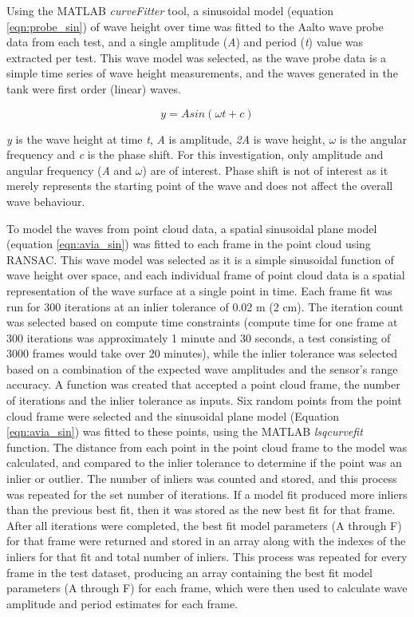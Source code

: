 Using the MATLAB \emph{curveFitter} tool, a sinusoidal model (equation \ref{eqn:probe_sin}) of wave height over time was fitted to the Aalto wave probe data from each test, and a single amplitude (\textit{A}) and period (\textit{t}) value was extracted per test. This wave model was selected, as the wave probe data is a simple time series of wave height measurements, and the waves generated in the tank were first order (linear) waves.

\begin{equation} \label{eqn:probe_sin}
    y = Asin(\omega t + c)
\end{equation}

\textit{y} is the wave height at time \textit{t}, \textit{A} is  amplitude, \textit{2A} is  wave height, \textit{$\omega$} is the  angular frequency and \textit{c} is the phase shift. For this investigation, only amplitude and angular frequency (\textit{A} and \textit{$\omega$}) are of interest. Phase shift is not of interest as it merely represents the starting point of the wave and does not affect the overall wave behaviour.

To model the waves from point cloud data, a spatial sinusoidal plane model (equation \ref{eqn:avia_sin}) was fitted to each frame in the point cloud using \ac{RANSAC}. This wave model was selected as it is a simple sinusoidal function of wave height over space, and each individual frame of point cloud data is a spatial representation of the wave surface at a single point in time. Each frame fit was run for 300 iterations at an inlier tolerance of 0.02 m (2 cm). The iteration count was selected based on compute time constraints (compute time for one frame at 300 iterations was approximately 1 minute and 30 seconds, a test consisting of 3000 frames would take over 20 minutes), while the inlier tolerance was selected based on a combination of the expected wave amplitudes and the sensor's range accuracy. A function was created that accepted a point cloud frame, the number of iterations and the inlier tolerance as inputs. Six random points from the point cloud frame were selected and the sinusoidal plane model (Equation \ref{eqn:avia_sin}) was fitted to these points, using the MATLAB \emph{lsqcurvefit} function. The distance from each point in the point cloud frame to the model was calculated, and compared to the inlier tolerance to determine if the point was an inlier or outlier. The number of inliers was counted and stored, and this process was repeated for the set number of iterations. If a model fit produced more inliers than the previous best fit, then it was stored as the new best fit for that frame. After all iterations were completed, the best fit model parameters (A through F) for that frame were returned and stored in an array along with the indexes of the inliers for that fit and total number of inliers. This process was repeated for every frame in the test dataset, producing an array containing the best fit model parameters (A through F) for each frame, which were then used to calculate wave amplitude and period estimates for each frame.

